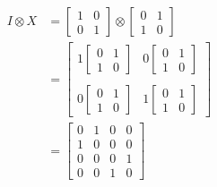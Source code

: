 \begin{align*}
	I \otimes X &= \begin{bmatrix}
		1 & 0 \\
		0 & 1
	\end{bmatrix}
	\otimes
	\begin{bmatrix}
		0 & 1 \\
		1 & 0
	\end{bmatrix}\\
	&=\begin{bmatrix}
		1\begin{bmatrix}
		0 & 1 \\
		1 & 0
		\end{bmatrix}
		&
		0\begin{bmatrix}
		0 & 1 \\
		1 & 0
		\end{bmatrix}
		\\ \\
		0\begin{bmatrix}
		0 & 1 \\
		1 & 0
		\end{bmatrix}
		&
		1\begin{bmatrix}
		0 & 1 \\
		1 & 0
		\end{bmatrix}
	\end{bmatrix} \\
	&=
	\begin{bmatrix}
	0 & 1 & 0 & 0 \\
	1 & 0 & 0 & 0 \\
	0 & 0 & 0 & 1 \\
	0 & 0 & 1 & 0
	\end{bmatrix}
\end{align*}
